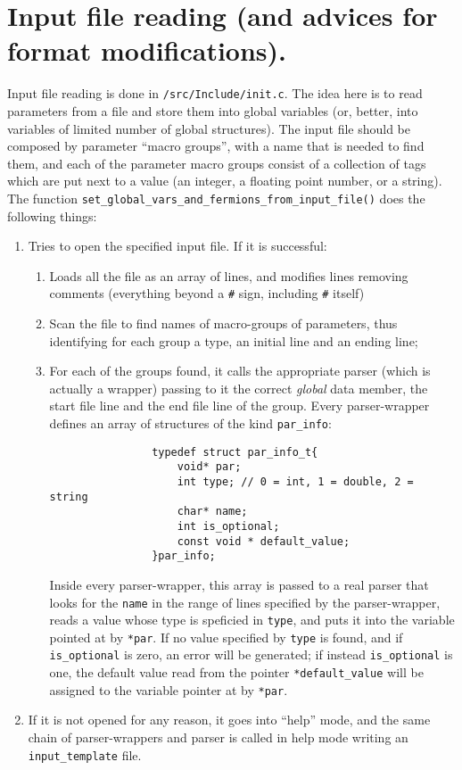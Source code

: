 \section{Input file reading (and advices for format modifications).}
Input file reading is done in \verb|/src/Include/init.c|. The idea here is to 
read parameters from a file and store them into global variables (or, better, 
into variables of limited number of global structures). The input file should 
be composed by parameter ``macro groups'', with a name that is needed to find 
them, and each of the parameter macro groups consist of a collection of tags 
which are put next to a value (an integer, a floating point number, or a 
string). The function 
\verb|set_global_vars_and_fermions_from_input_file()| does the 
following things:
\begin{enumerate}
    \item Tries to open the specified input file. If it is successful:
        \begin{enumerate}
            \item Loads all the file as an array of lines, and modifies lines removing 
                comments (everything beyond a \verb|#| sign, including \verb|#| itself)
            \item Scan the file to find names of macro-groups of parameters, thus 
                identifying for each group a type, an initial line and an ending line;
            \item For each of the groups found, it calls the appropriate parser (which 
                is actually a wrapper) passing to it the correct \emph{global} data member, 
                the start file line and the end file line of the group. Every parser-wrapper 
                defines an array of structures of the kind \verb|par_info|:
                \begin{verbatim}
                typedef struct par_info_t{
                    void* par;
                    int type; // 0 = int, 1 = double, 2 = string
                    char* name;
                    int is_optional;
                    const void * default_value;
                }par_info;
                \end{verbatim}
                Inside every parser-wrapper, this array is passed to a real parser that looks 
                for the \verb|name| in the range of lines specified by the parser-wrapper, 
                reads a value whose type is speficied in \verb|type|, and puts it into the 
                variable pointed at by \verb|*par|. If no value specified by \verb|type| is 
                found, and if \verb|is_optional| is zero, an error will be generated; if 
                instead \verb|is_optional| is one, the default value read from the pointer 
                \verb|*default_value| will be assigned to the variable pointer at by 
                \verb|*par|.
        \end{enumerate}
    \item If it is not opened for any reason, it goes into ``help'' mode, and the 
        same chain of parser-wrappers and parser is called in help mode writing an 
        \verb|input_template| file.
\end{enumerate}
